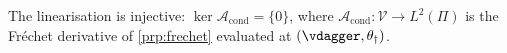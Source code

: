 %
%

\begin{assumption}\label{ass:completeness}
The linearisation is injective: $\ker\mathcal A_{\mathrm{cond}}=\{0\}$, where
$\mathcal A_{\mathrm{cond}}:\mathcal V\to L^{2}(\Pi)$ is the Fr\'echet derivative of
\cref{prp:frechet} evaluated at $(\vdagger,\theta_\dagger)$.
\end{assumption}

